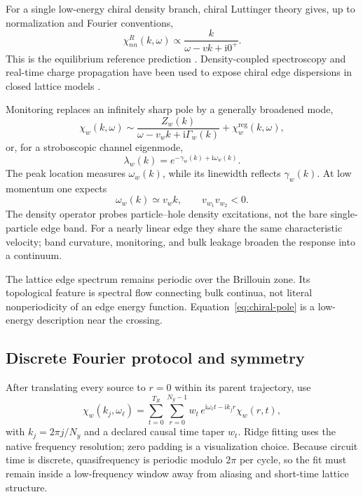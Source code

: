 \documentclass[aps,prb,onecolumn,nofootinbib,superscriptaddress]{revtex4-2}
\newcommand{\ii}{\mathrm{i}}
\begin{document}
For a single low-energy chiral density branch, chiral Luttinger theory gives,
up to normalization and Fourier conventions,
\begin{equation}
  \chi^R_{nn}(k,\omega)
  \propto\frac{k}{\omega-vk+\ii0^+}.
  \label{eq:chiral-pole}
\end{equation}
This is the equilibrium reference prediction
\cite{Wen1990}.  Density-coupled spectroscopy and real-time charge propagation
have been used to expose chiral edge dispersions in closed lattice models
\cite{GoldmanBeugnonGerbier2012,DongGrushinMotrukPollmann2018}.

Monitoring replaces an infinitely sharp pole by a generally broadened mode,
\begin{equation}
  \chi_w(k,\omega)
  \sim\frac{Z_w(k)}{\omega-v_wk+\ii\Gamma_w(k)}
       +\chi_w^{\mathrm{reg}}(k,\omega),
  \label{eq:broadened-pole}
\end{equation}
or, for a stroboscopic channel eigenmode,
\begin{equation}
  \lambda_w(k)=e^{-\gamma_w(k)+\ii\omega_w(k)}.
  \label{eq:channel-dispersion}
\end{equation}
The peak location measures $\omega_w(k)$, while its linewidth reflects
$\gamma_w(k)$.  At low momentum one expects
\begin{equation}
  \omega_w(k)\simeq v_w k,
  \qquad v_{w_1}v_{w_2}<0.
  \label{eq:opposite-velocities}
\end{equation}
The density operator probes particle--hole density excitations, not the bare
single-particle edge band.  For a nearly linear edge they share the same
characteristic velocity; band curvature, monitoring, and bulk leakage broaden
the response into a continuum.

The lattice edge spectrum remains periodic over the Brillouin zone.  Its
topological feature is spectral flow connecting bulk continua, not literal
nonperiodicity of an edge energy function.  Equation~\eqref{eq:chiral-pole} is
a low-energy description near the crossing.

\subsection{Discrete Fourier protocol and symmetry}

After translating every source to $r=0$ within its parent trajectory, use
\begin{equation}
  \chi_w(k_j,\omega_\ell)
  =\sum_{t=0}^{T_R}\sum_{r=0}^{N_y-1}
  w_t\,e^{\ii\omega_\ell t-\ii k_jr}\chi_w(r,t),
  \label{eq:discrete-fourier}
\end{equation}
with $k_j=2\pi j/N_y$ and a declared causal time taper $w_t$.  Ridge fitting
uses the native frequency resolution; zero padding is a visualization choice.
Because circuit time is discrete, quasifrequency is periodic modulo $2\pi$ per
cycle, so the fit must remain inside a low-frequency window away from aliasing
and short-time lattice structure.
\end{document}
